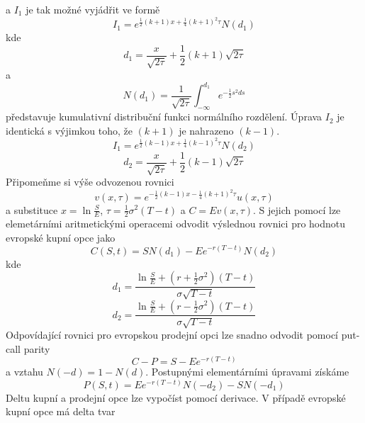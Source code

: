 \documentclass[a4paper]{book}
\begin{document}
a $I_1$ je tak možné vyjádřit ve formě
\begin{equation*}
I_1 = e^{\frac{1}{2}(k+1)x + \frac{1}{4}(k + 1)^2 \tau}N(d_1)
\end{equation*}
kde
\begin{equation*}
d_1 = \frac{x}{\sqrt{2 \tau}} + \frac{1}{2}(k + 1)\sqrt{2 \tau}
\end{equation*}
a
\begin{equation*}
N(d_1) = \frac{1}{\sqrt{2 \tau}}\int^{d_1}_{-\infty}e^{-\frac{1}{2}s^2 ds}
\end{equation*}
představuje kumulativní distribuční funkci normálního rozdělení. Úprava $I_2$ je identická s výjimkou toho, že $(k + 1)$ je nahrazeno $(k - 1)$.
\begin{equation*}
I_1 = e^{\frac{1}{2}(k - 1)x + \frac{1}{4}(k - 1)^2 \tau}N(d_2)
\end{equation*}
\begin{equation*}
d_2 = \frac{x}{\sqrt{2 \tau}} + \frac{1}{2}(k - 1)\sqrt{2 \tau}
\end{equation*}
Připomeňme si výše odvozenou rovnici
\begin{equation*}
v(x, \tau) = e^{-\frac{1}{2}(k - 1)x - \frac{1}{4}(k + 1)^2 \tau}u(x, \tau)
\end{equation*}
a substituce $x = \ln \frac{S}{E}$, $\tau = \frac{1}{2}\sigma^2(T - t)$ a $C = Ev(x,\tau)$. S jejich pomocí lze elemetárními aritmetickými operacemi odvodit výslednou rovnici pro hodnotu evropské kupní opce jako
\begin{equation*}
C(S,t) = SN(d_1) - Ee^{-r(T - t)}N(d_2)
\end{equation*}
kde
\begin{equation*}
d_1 = \frac{\ln\frac{S}{E} + (r + \frac{1}{2}\sigma^2)(T - t)}{\sigma \sqrt{T - t}}
\end{equation*}
\begin{equation*}
d_2 = \frac{\ln\frac{S}{E} + (r - \frac{1}{2}\sigma^2)(T - t)}{\sigma \sqrt{T - t}}
\end{equation*}
Odpovídající rovnici pro evropskou prodejní opci lze snadno odvodit pomocí put-call parity
\begin{equation*}
C - P = S - Ee^{-r(T - t)}
\end{equation*}
a vztahu $N(-d) = 1 - N(d)$. Postupnými elementárními úpravami získáme
\begin{equation*}
P(S,t) = Ee^{-r(T - t)}N(-d_2) - SN(-d_1)
\end{equation*}
Deltu kupní a prodejní opce lze vypočíst pomocí derivace. V případě evropské kupní opce má delta tvar
\end{document}
